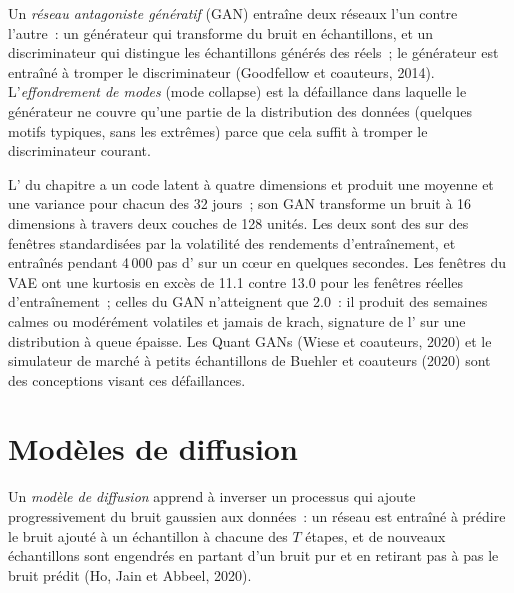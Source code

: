 \begin{definition}\label{def:ml:generative-models-and-synthetic-data:gan}
Un \emph{réseau antagoniste génératif} (GAN) entraîne deux réseaux l'un contre l'autre~:
un générateur qui transforme du bruit en échantillons, et un discriminateur qui distingue les échantillons générés des réels~; le générateur est
entraîné à tromper le discriminateur (Goodfellow et coauteurs, 2014). L'\emph{effondrement de modes} (mode collapse) est la
défaillance dans laquelle le générateur ne couvre qu'une partie de la distribution des données (quelques motifs typiques, sans les extrêmes)
parce que cela suffit à tromper le discriminateur courant.
\end{definition}

L' du chapitre a un code latent à quatre dimensions et produit une moyenne et une variance pour chacun des 32 jours~; son GAN
transforme un bruit à 16 dimensions à travers deux couches de 128 unités. Les deux sont des  sur des fenêtres standardisées par la
volatilité des rendements d'entraînement, et entraînés pendant 4\,000 pas d' sur un cœur en quelques secondes. Les fenêtres du VAE ont une kurtosis en excès
de 11.1 contre 13.0 pour les fenêtres réelles d'entraînement~; celles du GAN n'atteignent que 2.0~: il produit des semaines calmes ou modérément volatiles
et jamais de krach, signature de l' sur une distribution à queue épaisse. Les Quant GANs (Wiese et coauteurs, 2020) et
le simulateur de marché à petits échantillons de Buehler et coauteurs (2020) sont des conceptions visant ces défaillances.

\section{Modèles de diffusion}

\begin{definition}\label{def:ml:generative-models-and-synthetic-data:diffusion}
Un \emph{modèle de diffusion} apprend à inverser un processus qui ajoute progressivement du bruit gaussien aux
données~: un réseau est entraîné à prédire le bruit ajouté à un échantillon à chacune des $T$ étapes, et de nouveaux échantillons sont engendrés en
partant d'un bruit pur et en retirant pas à pas le bruit prédit (Ho, Jain et Abbeel, 2020).
\end{definition}

